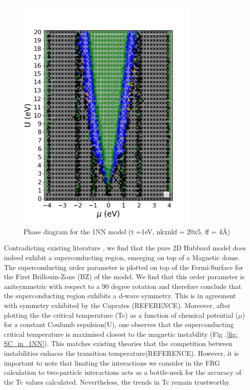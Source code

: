 \documentclass[12pt]{article}
\begin{document}
\begin{figure}[htbp]  %
    \centering
    \includegraphics[width=0.8\textwidth]{1NNpd.png}  %
    \caption{Phase diagram for the 1NN model (t =1eV, nkxnkf = 20x5, ff = 4\AA) }
    \label{fig:1NNpd}
\end{figure}



\noindent Contradicting existing literature \cite{qin2020absence}, we find that the pure 2D Hubbard model does indeed exhibit a superconducting region, emerging on top of a Magnetic dome. 
The superconducting order parameter is plotted on top of the Fermi-Surface for the First Brillouin-Zone (BZ) of the model.
We find that this order parameter is anitsymmetric with respect to a 90 degree rotation and therefore conclude 
that the superconducting region exhibits a d-wave symmetry. This is in agreement with symmetry exhibited by the Cuprates (REFERENCE). Moreover, after plotting the the critical temperature (Tc) as a function of chemical potential ($\mu$) for a constant Coulumb repulsion(U), one observes that
the superconducting critical temperature is maximised closest to the magnetic instability (Fig .\ref{fig: SC_in_1NN}). This matches existing theories that the competition between instabilities enhaces the transition temperature(REFERENCE).
However, it is important to note that limiting the interactions we consider in the FRG calculation to two-particle interactions acts as a bottle-neck for the accuracy of the Tc values calculated. Nevertheless, the trends in Tc remain trustworthy. 
\end{document}
